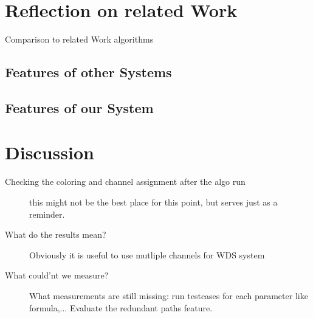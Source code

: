 \section{Reflection on related Work}
  Comparison to related Work algorithms\newline
  \subsection{Features of other Systems}
  \subsection{Features of our System}
\section{Discussion}
  \begin{description}
   \item [Checking the coloring and channel assignment after the algo run]
   this might not be the best place for this point, but serves just as a reminder.
   \item [What do the results mean?]
   Obviously it is useful to use mutliple channels for WDS system
   \item[What could'nt we measure?]
   What measurements are still missing:  run testcases for each parameter like formula,...
   Evaluate the redundant paths feature.
  \end{description}